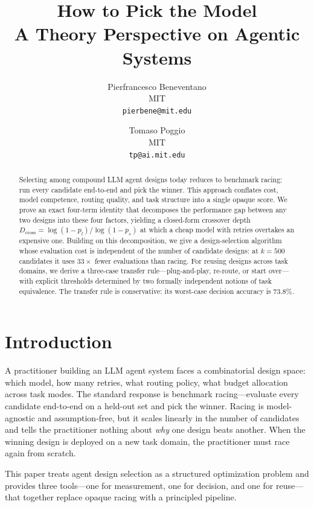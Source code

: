 \documentclass[11pt]{article}
\title{How to Pick the Model\\ A Theory Perspective on Agentic Systems}
\author{
  Pierfrancesco Beneventano \\
  MIT \\
  \texttt{pierbene@mit.edu}
  \and
  Tomaso Poggio \\
  MIT \\
  \texttt{tp@ai.mit.edu}
}
\date{}
\begin{document}
\maketitle


\begin{abstract}
Selecting among compound LLM agent designs today reduces to benchmark
racing: run every candidate end-to-end and pick the winner.
This approach conflates cost, model competence, routing quality, and
task structure into a single opaque score.
We prove an exact four-term identity that decomposes the performance gap
between any two designs into these four factors, yielding a closed-form
crossover depth $D_{\mathrm{cross}} = \log(1-p_l)/\log(1-p_s)$ at which a
cheap model with retries overtakes an expensive one.
Building on this decomposition, we give a design-selection algorithm
whose evaluation cost is independent of the number of candidate designs:
at $k{=}500$ candidates it uses $33\times$ fewer evaluations than racing.
For reusing designs across task domains, we derive a three-case transfer
rule---plug-and-play, re-route, or start over---with explicit thresholds
determined by two formally independent notions of task equivalence.
The transfer rule is conservative: its worst-case decision accuracy is
73.8\%.
\end{abstract}

\section{Introduction}
\label{sec:intro}

A practitioner building an LLM agent system faces a combinatorial design
space: which model, how many retries, what routing policy, what budget
allocation across task modes.  The standard response is benchmark
racing---evaluate every candidate end-to-end on a held-out set and pick the
winner.  Racing is model-agnostic and assumption-free, but it scales
linearly in the number of candidates and tells the practitioner nothing
about \emph{why} one design beats another.  When the winning design is
deployed on a new task domain, the practitioner must race again from
scratch.

This paper treats agent design selection as a structured optimization
problem and provides three tools---one for measurement, one for decision,
and one for reuse---that together replace opaque racing with a principled
pipeline.
\end{document}
